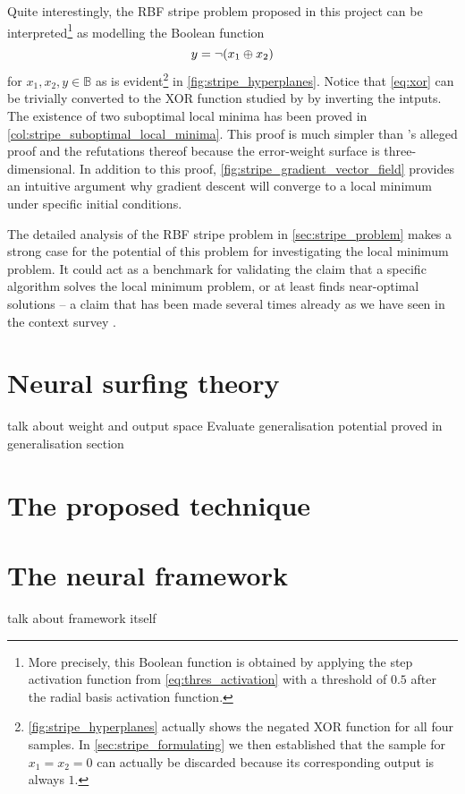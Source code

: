 Quite interestingly, the RBF stripe problem proposed in this project can be interpreted\footnote{More precisely, this Boolean function is obtained by applying the step activation function from \ref{eq:thres_activation} with a threshold of $0.5$ after the radial basis activation function.} as modelling the Boolean function
\begin{equation}
    \label{eq:xor}
    y=\neg (x_1 \oplus x_2)
\end{equation}
for $x_1,x_2,y\in \mathbb{B}$ as is evident\footnote{\ref{fig:stripe_hyperplanes} actually shows the negated XOR function for all four samples. In \ref{sec:stripe_formulating} we then established that the sample for $x_1=x_2=0$ can actually be discarded because its corresponding output is always $1$.} in \ref{fig:stripe_hyperplanes}.
Notice that \ref{eq:xor} can be trivially converted to the XOR function studied by \citeauthor{blum1989} by inverting the intputs.
The existence of two suboptimal local minima has been proved in \ref{col:stripe_suboptimal_local_minima}.
This proof is much simpler than \citeauthor{blum1989}'s alleged proof and the refutations thereof because the error-weight surface is three-dimensional.
In addition to this proof, \ref{fig:stripe_gradient_vector_field} provides an intuitive argument why gradient descent will converge to a local minimum under specific initial conditions.

The detailed analysis of the RBF stripe problem in \ref{sec:stripe_problem} makes a strong case for the potential of this problem for investigating the local minimum problem.
It could act as a benchmark for validating the claim that a specific algorithm solves the local minimum problem, or at least finds near-optimal solutions -- a claim that has been made several times already as we have seen in the context survey \cite{kawaguchi2016,choi2008,hirasawa1998,lo2012,lo2017}.

\section{Neural surfing theory}
talk about weight and output space
Evaluate generalisation potential proved in generalisation section
\section{The proposed technique}


\section{The neural framework}
talk about framework itself

